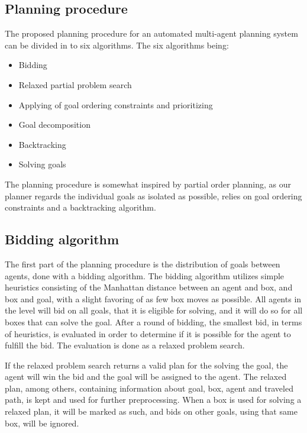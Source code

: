\documentclass[Main]{subfiles}
\begin{document}
\subsection{Planning procedure}

The proposed planning procedure for an automated multi-agent planning system can be divided in to six algorithms. The six algorithms being:
\begin{itemize}
    \item Bidding
    \item Relaxed partial problem search
    \item Applying of goal ordering constraints and prioritizing
    \item Goal decomposition
    \item Backtracking
    \item Solving goals
\end{itemize}

The planning procedure is somewhat inspired by partial order planning, as our planner regards the individual goals as isolated as possible, relies on goal ordering constraints and a backtracking algorithm. 


\subsection{Bidding algorithm}
The first part of the planning procedure is the distribution of goals between agents, done with a bidding algorithm\citep{VanderKrogt2005}. The bidding algorithm utilizes simple heuristics consisting of the Manhattan distance between an agent and box, and box and goal, with a slight favoring of as few box moves as possible. All agents in the level will bid on all goals, that it is eligible for solving, and it will do so for all boxes that can solve the goal. After a round of bidding, the smallest bid, in terms of heuristics, is evaluated in order to determine if it is possible for the agent to fulfill the bid. The evaluation is done as a relaxed problem search. 

If the relaxed problem search returns a valid plan for the solving the goal, the agent will win the bid and the goal will be assigned to the agent. The relaxed plan, among others, containing information about goal, box, agent and traveled path, is kept and used for further preprocessing. 
When a box is used for solving a relaxed plan, it will be marked as such, and bids on other goals, using that same box, will be ignored. 
\end{document}
